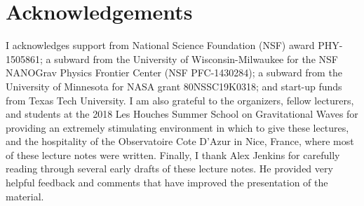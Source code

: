 \section*{Acknowledgements}
\label{s:acknowledgements}

I acknowledges support from National Science Foundation (NSF)
award PHY-1505861; a subward from the University of Wisconsin-Milwaukee
for the NSF NANOGrav Physics Frontier Center (NSF PFC-1430284); 
a subward from the University of Minnesota for NASA grant 80NSSC19K0318; 
and start-up funds from Texas Tech University.
I am also grateful to the organizers, fellow lecturers, and students 
at the 2018 Les Houches Summer School on Gravitational 
Waves for providing an extremely stimulating environment in which to 
give these lectures, and the hospitality of the Observatoire Cote
D'Azur in Nice, France, where most of these lecture notes were written.
Finally, I thank Alex Jenkins for carefully reading through several
early drafts of these lecture notes.
He provided very helpful feedback and comments that have improved 
the presentation of the material.
 
